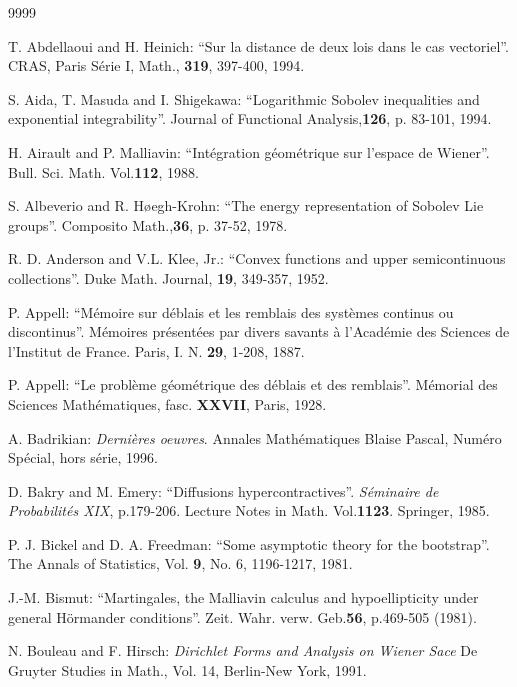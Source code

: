\documentclass[12pt,a4paper]{book}
\begin{document}
\begin{thebibliography}{9999}

T. Abdellaoui and H. Heinich: ``Sur la distance de deux lois dans le
cas vectoriel''. CRAS, Paris S\'erie I, Math., {\bf 319}, 397-400, 1994.




S. Aida, T. Masuda and I. Shigekawa: ``Logarithmic
Sobolev inequalities and exponential integrability''. Journal of
Functional Analysis,{\bf  126}, p. 83-101, 1994.

H. Airault and P. Malliavin: ``Int\'egration g\'eom\'etrique sur
l'espace de Wiener''. Bull. Sci. Math. Vol.{\bf 112}, 1988.

S. Albeverio and R. H{\o}egh-Krohn: ``The energy
  representation of Sobolev Lie groups''. Composito Math.,{\bf 36},
  p. 37-52, 1978.

R. D. Anderson and V.L. Klee, Jr.: ``Convex functions and upper
semicontinuous collections''. Duke Math. Journal, {\bf 19}, 349-357, 1952.

P. Appell: ``M\'emoire sur d\'eblais et les remblais des syst\`emes
continus ou discontinus''. M\'emoires pr\'esent\'ees par divers
savants \`a l'Acad\'emie des Sciences de l'Institut de France. Paris,
I. N. {\bf 29}, 1-208, 1887.

P. Appell: ``Le probl\`eme g\'eom\'etrique des d\'eblais et des
remblais''. M\'emorial des Sciences Math\'ematiques, fasc. {\bf
XXVII}, Paris, 1928.




A. Badrikian:
{\sl Derni\`eres oeuvres}.
Annales Math\'ematiques Blaise Pascal, Num\'ero Sp\'ecial, hors
s\'erie, 1996.

D. Bakry and M. Emery:
``Diffusions hypercontractives''. {\sl S\'eminaire de Probabilit\'es  XIX},
p.179-206. Lecture Notes in Math. Vol.{\bf 1123}. Springer, 1985.

P. J. Bickel and D. A. Freedman:
``Some asymptotic theory for the bootstrap''. The Annals of
Statistics, Vol. {\bf 9}, No. 6, 1196-1217, 1981.



J.-M. Bismut: ``Martingales, the Malliavin calculus and
hypoellipticity under general H\"ormander
conditions''. Zeit. Wahr. verw. Geb.{\bf  56}, p.469-505 (1981).

N. Bouleau and F. Hirsch: {\sl  Dirichlet Forms and
    Analysis on Wiener Sace} De Gruyter Studies in Math., Vol. 14,
  Berlin-New York, 1991.


\end{thebibliography}
\end{document}

